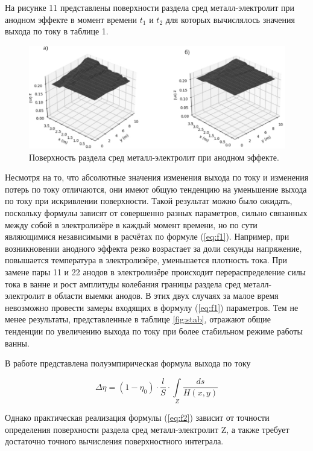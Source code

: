 \documentclass[pdflatex,sn-mathphys-gost]{pmi-jnl}
\begin{document}
На рисунке 11 представлены поверхности раздела сред металл-электролит при анодном эффекте в момент времени $t_1$ и $t_2$ для которых вычислялось значения выхода по току в таблице 1.

\begin{figure}[ht]
    \centering
    \includegraphics[width=\textwidth]{Анодный эффект поверхность.png}
    \caption{Поверхность раздела сред металл-электролит при анодном эффекте.}
    \label{fig:anodeffect}
\end{figure}

Несмотря на то, что абсолютные значения изменения выхода по току и изменения потерь по току отличаются, они имеют общую тенденцию на уменьшение выхода по току при искривлении поверхности. Такой результат можно было ожидать, поскольку формулы зависят от совершенно разных параметров, сильно связанных между собой в электролизёре в каждый момент времени, но по сути являющимися независимыми в расчётах по формуле (\ref{eq:f1}). Например, при возникновении анодного эффекта резко возрастает за доли секунды напряжение, повышается температура в электролизёре, уменьшается плотность тока. При замене пары 11 и 22 анодов в электролизёре происходит перераспределение силы тока в ванне и рост амплитуды колебания границы раздела сред металл-электролит в области выемки анодов. В этих двух случаях за малое время невозможно провести замеры входящих в формулу (\ref{eq:f1}) параметров. Тем не менее результаты, представленные в таблице \ref{fig:stab}, отражают общие тенденции по увеличению выхода по току при более стабильном режиме работы ванны.

В работе \cite{litlink:derkach2} представлена полуэмпирическая формула выхода по току

\begin{equation} \label{eq:f2}
	\Delta \eta = (1- \eta_0) \cdot \frac{l}{S} \cdot \int\limits_Z \frac{ds}{H(x,y)}
\end{equation}

Однако практическая реализация формулы (\ref{eq:f2}) зависит от точности определения поверхности раздела сред металл-электролит Z, а также требует достаточно точного вычисления поверхностного интеграла.
\end{document}
